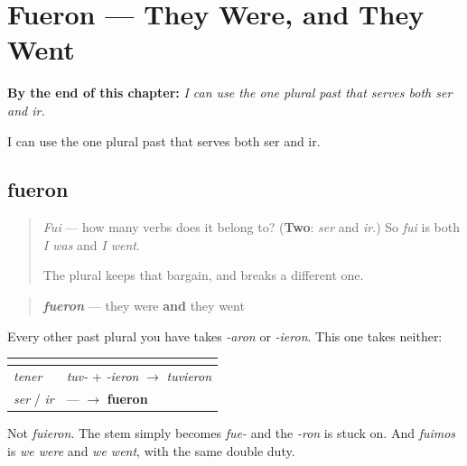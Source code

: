 
\chapter{Fueron --- They Were, and They Went}
\label{ch:fueron}

\begin{chapteropening}
\textbf{By the end of this chapter:} \emph{I can use the one plural past that serves both ser and ir.}

I can use the one plural past that serves both ser and ir.
\end{chapteropening}

\section[fueron]{fueron}

\label{lesson:ES-C55-fueron}



\begin{quote}
\emph{Fui} — how many verbs does it belong to? (\textbf{Two}: \emph{ser} and \emph{ir}.) So \emph{fui} is both \emph{I was} and \emph{I went}.

The plural keeps that bargain, and breaks a different one.
\end{quote}

\begin{grammarlens}[title={Grammar Lens: the form that refuses the ending}]
\begin{quote}
\emph{\textbf{fueron}} — they were \textbf{and} they went
\end{quote}

Every other past plural you have takes \emph{-aron} or \emph{-ieron}. This one takes neither:

\noindent
\begin{tabularx}{\linewidth}{@{}>{\raggedright\arraybackslash}X>{\raggedright\arraybackslash}X@{}}
\toprule
\textbf{} & \textbf{} \\
\midrule
\emph{tener} & \emph{tuv-} + \emph{-ieron} $\to$ \emph{tuvieron} \\
\emph{ser} / \emph{ir} & — $\to$ \textbf{fueron} \\
\bottomrule
\end{tabularx}

Not \emph{fuieron}. The stem simply becomes \emph{fue-} and the \emph{-ron} is stuck on. And \emph{fuimos} is \emph{we were} and \emph{we went}, with the same double duty.
\end{grammarlens}

